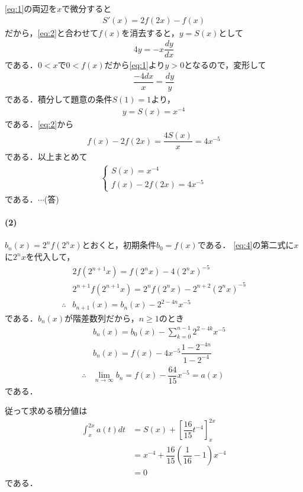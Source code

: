 \documentclass[../../main.tex]{subfiles}
\begin{document}
\cref{eq:1}の両辺を$x$で微分すると
\begin{align}
  S'(x)=2f(2x)-f(x) \label{eq:3}
\end{align}
だから，\cref{eq:2}と合わせて$f(x)$を消去すると，$y=S(x)$として
\begin{align}
  4y=-x\dfrac{dy}{dx}
\end{align}
である．$0<x$で$0<f(x)$だから\cref{eq:1}より$y>0$となるので，変形して
\begin{align}
  \dfrac{-4dx}{x}=\dfrac{dy}{y}
\end{align}
である．積分して題意の条件$S(1)=1$より，
\begin{align}
  y=S(x)=x^{-4}
\end{align}
である．\cref{eq:2}から
\begin{align}
  f(x)-2f(2x) = \dfrac{4S(x)}{x} = 4x^{-5}
\end{align}
である．以上まとめて
\begin{align}
  \begin{cases}
    S(x)=x^{-4} \\
    f(x)-2f(2x) = 4x^{-5}
  \end{cases} \label{eq:4}
\end{align}
である．$\cdots$(答)

\paragraph{(2)}

$b_n(x)=2^nf(2^nx)$とおくと，初期条件$b_0=f(x)$である．
\cref{eq:4}の第二式に$x$に$2^nx$を代入して，
\begin{align}
  & 2f(2^{n+1}x)=f(2^nx)-4(2^nx)^{-5} \\
  & 2^{n+1}f(2^{n+1}x)=2^nf(2^nx)-2^{n+2}(2^nx)^{-5} \\
  \therefore
  & b_{n+1}(x)=b_n(x)-2^{2-4n}x^{-5} \label{eq:5}
\end{align}
である．$b_n(x)$が階差数列だから，$n\ge1$のとき
\begin{align}
  & b_n(x)=b_0(x)-\sum_{k=0}^{n-1}2^{2-4k}x^{-5} \\
  & b_n(x)=f(x)-4x^{-5}\dfrac{1-2^{-4n}}{1-2^{-4}} \\
  \therefore
  & \lim_{n\to\infty}b_n = f(x)-\dfrac{64}{15}x^{-5}=a(x) \label{eq:6}
\end{align}
である．

従って求める積分値は
\begin{align}
  \int_{x}^{2x}a(t)dt
  &=S(x)+\left[\dfrac{16}{15}t^{-4}\right]_x^{2x} \\
  &=x^{-4}+\dfrac{16}{15}\left(\dfrac{1}{16}-1\right)x^{-4} \\
  &=0
\end{align}
である．
\end{document}
